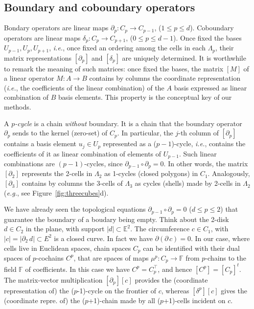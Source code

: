 \documentclass{juliacon}
\def\E{\mathbb{E}}
\begin{document}
\subsection{Boundary and coboundary operators}
Bondary operators are linear maps $\partial_p : C_p \to C_{p-1}$, ($1\leq p\leq d$). Coboundary operators are linear maps $\delta_p : C_p \to C_{p+1}$, ($0\leq p\leq d-1$). Once fixed the bases $U_{p-1}, U_{p}, U_{p+1}$, \emph{i.e.}, once fixed an ordering among the cells in each $\Lambda_p$, their matrix representations $[\partial_{p}]$ and $[\delta_{p}]$ are uniquely determined. 
It is worthwhile to remark the meaning of such matrices: once fixed the bases, the matrix $[M]$ of a linear operator $M: A\to B$ contains by columns the coordinate representation (\emph{i.e.}, the coefficients of the linear combination) of the $A$ basis expressed as linear combination of $B$ basis elements. This property is the conceptual key of our methods.

A \emph{$p$-cycle} is a chain \emph{without} boundary. It is a chain that the boundary operator $\partial_p$ sends to the kernel (zero-set) of $C_p$. In particular, the $j$-th column of $[\partial_p]$ contains a basis element $u_j\in U_p$ represented as a ($p-1$)-cycle, \emph{i.e.}, contains the coefficients of it as linear combination of elements of $U_{p-1}$. Such linear combinations are $(p-1)$-cycles, since $\partial_{p-1}\circ\partial_p = 0$.  In other words, the matrix $[\partial_2]$ represents the 2-cells in $\Lambda_2$ as 1-cycles (closed polygons) in $C_1$.  Analogously, $[\partial_3]$ contains by columns the 3-cells of $\Lambda_3$ as cycles (shells) made by 2-cells in $\Lambda_2$ (\emph{e.g.}, see Figure~\ref{fig:threecubes}d).

We  have already seen the topological equations $\partial_{p-1}\circ\partial_p = 0$ ($d\leq p\leq 2$) that guarantee the boundary of a boudary being empty. Think about the 2-disk $d \in C_2$ in the plane, with support $|d|\subset\E^2$. The circumference $c\in C_1$, with $|c| = |\partial_2\, d| \subset E^2$ is  a closed curve. In fact we have $\partial (\partial\, c) = 0$. In our case, where cells live in Euclidean spaces, chain spaces $C_p$ can be identified with their dual spaces of $p$-cochains $C^p$, that are spaces of maps $\mu^p: C_p\to \mathbb{F}$ from $p$-chains to the field $\mathbb{F}$ of coefficients. In this case we have $C^p = C_p^\top$, and hence $[C^p] = [C_p]^t$. The matrix-vector multiplication $[\partial_p][c]$ provides the (coordinate representation of) the ($p$-1)-cycle on the frontier of $c$, whereas $[\delta^p][c]$ gives the (coordinate repre. of) the ($p$+1)-chain made by all ($p$+1)-cells incident on $c$.
\end{document}
